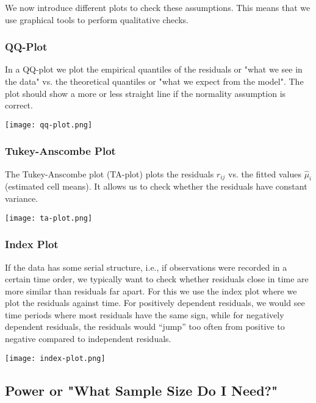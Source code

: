 We now introduce different plots to check these assumptions. This means that we use graphical tools to perform qualitative checks.

\subsubsection{QQ-Plot}

In a QQ-plot we plot the empirical quantiles of the residuals or "what we see in the data" vs. the theoretical quantiles or "what we expect from the model". The plot should show a more or less straight line if the normality assumption is correct.
\\[-20pt]
\begin{center}
	\texttt{[image: qq-plot.png]}
\end{center}

\subsubsection{Tukey-Anscombe Plot}

The Tukey-Anscombe plot (TA-plot) plots the residuals $r_{ij}$ vs. the fitted values $\hat \mu_i$ (estimated cell means). It allows us to check whether the residuals have constant variance.
\begin{center}
	\texttt{[image: ta-plot.png]}
\end{center}

\subsubsection{Index Plot}

If the data has some serial structure, i.e., if observations were recorded in a certain time order, we typically want to check whether residuals close in time are more similar than residuals far apart. For this we use the index plot where we plot the residuals against time. For positively dependent residuals, we would see time periods where most residuals have the same sign, while for negatively dependent residuals, the residuals would “jump” too often from positive to negative compared to independent residuals. 
\begin{center}
	\texttt{[image: index-plot.png]}
\end{center}


\subsection{Power or "What Sample Size Do I Need?"}

